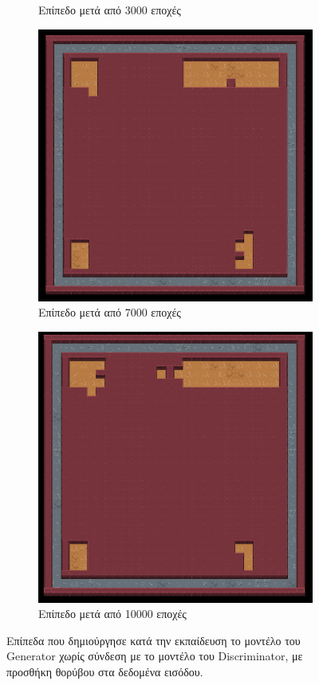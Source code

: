 \begin{figure}[H]
\begin{subfigure}{.5\textwidth}
  \caption{Επίπεδο μετά από 3000 εποχές}
  \label{fig:sfig2}
\end{subfigure}
\begin{subfigure}{.5\textwidth}
  \centering
  \includegraphics[width=.8\linewidth]{../images/result_images/dense-gan-with-fuzzy/generator_7000.png}
  \caption{Επίπεδο μετά από 7000 εποχές}
  \label{fig:sfig2}
\end{subfigure}
\begin{subfigure}{.5\textwidth}
  \centering
  \includegraphics[width=.8\linewidth]{../images/result_images/dense-gan-with-fuzzy/generator_10000.png}
  \caption{Επίπεδο μετά από 10000 εποχές}
  \label{fig:sfig2}
\end{subfigure}
\caption{Επίπεδα που δημιούργησε κατά την εκπαίδευση το μοντέλο του Generator χωρίς σύνδεση με το μοντέλο του Discriminator, με προσθήκη θορύβου στα δεδομένα εισόδου.}
\label{fig:fig}
\end{figure}

